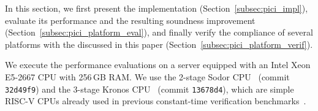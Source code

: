 In this section, we first present the \PICI implementation (Section~\ref{subsec:pici_impl}), evaluate its performance and the resulting soundness improvement (Section~\ref{subsec:pici_platform_eval}), and finally verify the compliance of several platforms with the \pics discussed in this paper (Section~\ref{subsec:pici_platform_verif}).

We execute the performance evaluations on a server equipped with an Intel Xeon E5-2667 CPU with 256\,GB RAM.
We use the 2-stage Sodor CPU~\cite{sodor} (commit \texttt{32d49f9}) and the 3-stage Kronos CPU~\cite{kronos} (commit \texttt{13678d4}), which are simple RISC-V CPUs already used in previous constant-time verification benchmarks~\cite{wang2023specification,tan2025contractshadowlogic,ceesay2024mucfi}.




